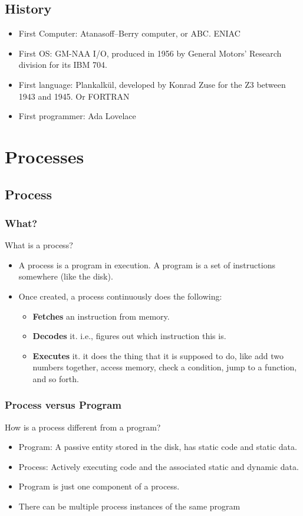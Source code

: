 \documentclass[12pt]{article}
\begin{document}
\subsection{History}
\begin{itemize}
    \item First Computer: Atanasoff–Berry computer, or ABC. ENIAC
    \item First OS: GM-NAA I/O, produced in 1956 by General Motors' Research division for its IBM 704.
    \item First language: Plankalkül, developed by Konrad Zuse for the Z3 between 1943 and 1945. Or FORTRAN
    \item First programmer: Ada Lovelace
\end{itemize}

\section{Processes}
\subsection{Process}
\subsubsection{What?}
What is a process?
\begin{itemize}
    \item A process is a program in execution. A program is a set of instructions somewhere (like the disk).
    \item Once created, a process continuously does the following: \begin{itemize}
        \item {\bfseries Fetches} an instruction from memory. 
        \item {\bfseries Decodes} it. i.e., figures out which instruction this is. 
        \item {\bfseries Executes} it. it does the thing that it is supposed to do, like add two numbers together, access memory, check a condition, jump to a function, and so forth.
    \end{itemize}
\end{itemize}

\subsubsection{Process versus Program}
How is a process different from a program?
\begin{itemize}
    \item Program: A passive entity stored in the disk, has static code and static data.
    \item Process: Actively executing code and the associated static and dynamic data.
    \item Program is just one component of a process.
    \item There can be multiple process instances of the same program
\end{itemize}
\end{document}
